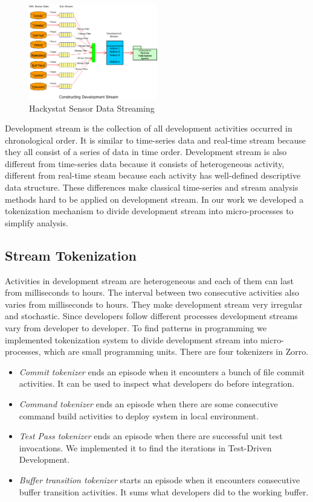 \documentclass[11pt,twocolumn]{article}
\begin{document}
\begin{figure}[ht] 
  \centering
  \includegraphics[width=0.5\textwidth]{picture/Streaming.eps}
  \caption{Hackystat Sensor Data Streaming}\label{fig:Streaming}
\end{figure} 

Development stream is the collection of all development activities occurred
in chronological order. It is similar to time-series data and real-time
stream because they all consist of a series of data in time order.
Development stream is also different from time-series data because it
consists of heterogeneous activity, different from real-time steam because
each activity has well-defined descriptive data structure. These
differences make classical time-series and stream analysis methods hard to
be applied on development stream. In our work we developed a tokenization
mechanism to divide development stream into micro-processes to simplify
analysis.

\subsection{Stream Tokenization}
Activities in development stream are heterogeneous and each of them can
last from milliseconds to hours. The interval between two consecutive
activities also varies from milliseconds to hours. They make development
stream very irregular and stochastic. Since developers follow different
processes development streams vary from developer to developer. To find
patterns in programming we implemented tokenization system to divide
development stream into micro-processes, which are small programming units.
There are four tokenizers in Zorro.
\begin{itemize}
\item \textit{Commit tokenizer} ends an episode when it encounters a bunch
  of file commit activities. It can be used to inspect what developers do
  before integration.
\item \textit{Command tokenizer} ends an episode when there are some
  consecutive command build activities to deploy system in local
  environment.
\item \textit{Test Pass tokenizer} ends an episode when there are
  successful unit test invocations. We implemented it to find the iterations
  in Test-Driven Development.
\item \textit{Buffer transition tokenizer} starts an episode when it
  encounters consecutive buffer transition activities. It sums what
  developers did to the working buffer.
\end{itemize}
\end{document}
